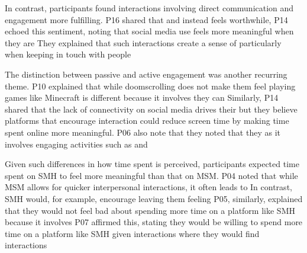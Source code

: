 In contrast, participants found interactions involving direct communication and engagement more fulfilling. P16 shared that  and instead  feels worthwhile,  P14 echoed this sentiment, noting that social media use feels more meaningful when they are  They explained that such interactions create a sense of  particularly when keeping in touch with people 

The distinction between passive and active engagement was another recurring theme. P10 explained that while doomscrolling does not make them feel  playing games like Minecraft is different because it involves  they can  Similarly, P14 shared that the lack of connectivity on social media drives their  but they believe platforms that encourage interaction could reduce screen time by making time spent online more meaningful. P06 also note that they noted that they  as it involves engaging activities such as  and  

Given such differences in how time spent is perceived, participants expected time spent on SMH to feel more meaningful than that on MSM. P04 noted that while MSM allows for quicker interpersonal interactions, it often leads to  In contrast, SMH would, for example, encourage  leaving them feeling  P05, similarly, explained that they would not feel bad about spending more time on a platform like SMH because it involves  P07 affirmed this, stating they would be willing to spend more time on a platform like SMH given interactions where they would find interactions 

